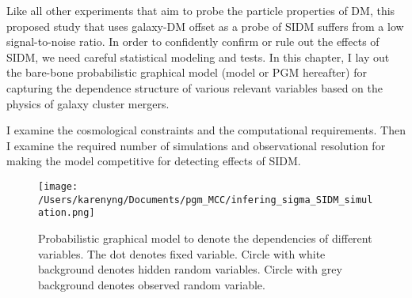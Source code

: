 \label{chapter2}

Like all other experiments that aim to probe the particle properties of
DM, this proposed study that uses galaxy-DM offset as a probe of SIDM suffers from a low signal-to-noise ratio. 
In order to confidently confirm or rule out the effects of SIDM, we need careful
statistical modeling and tests. 
In this chapter, I lay out the bare-bone probabilistic graphical model (model or PGM hereafter) for
capturing the dependence structure of various relevant variables based on the
physics of galaxy cluster mergers.  

I examine the cosmological constraints and the computational requirements.
Then I examine the required number of simulations and observational resolution for making
the model competitive for detecting effects of SIDM.\@ 
\begin{figure}
	\center
	\texttt{[image: /Users/karenyng/Documents/pgm\_MCC/infering\_sigma\_SIDM\_simulation.png]}
	\caption{Probabilistic graphical model to denote the dependencies of
		different variables. The dot denotes fixed variable. Circle with white
		background denotes hidden random variables. Circle with grey background
	denotes observed random variable.} 
\end{figure}

